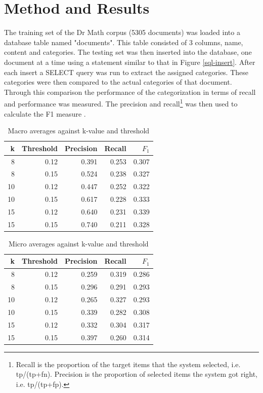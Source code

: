 \documentclass[twocolumn]{article}
\begin{document}
\section{Method and Results}

The training set of the Dr Math corpus (5305 documents) was loaded into a database 
table named "documents". This table consisted of 3 columns, name, content and 
categories. The testing set was then inserted into the database, one document at a time 
using a statement similar to that in Figure \ref{sql-insert}. After each insert a SELECT query was 
run to extract the assigned categories. These categories were then compared to the 
actual categories of that document. Through this comparison the performance of the 
categorization in terms of recall  and performance  was measured. The precision and 
recall\footnote{Recall is the proportion of the target items that the
system selected, i.e. tp/(tp+fn).  Precision is the proportion of
selected items the system got right, i.e. tp/(tp+fp).} was then used
to calculate the F1 measure \cite{calvo:01,sebastiani:02}.

\begin{table}
\begin{tabular}{|r|r|r|r|r|}
\hline
k  & Threshold & Precision & Recall & $F_1$ \\ \hline
8  & 0.12 & 0.391 & 0.253 & 0.307 \\ \hline
8  & 0.15 & 0.524 & 0.238 & 0.327 \\ \hline
10 & 0.12 & 0.447 & 0.252 & 0.322 \\ \hline
10 & 0.15 & 0.617 & 0.228 & 0.333 \\ \hline
15 & 0.12 & 0.640 & 0.231 & 0.339 \\ \hline
15 & 0.15 & 0.740 & 0.211 & 0.328 \\ \hline
\end{tabular}
\caption{Macro averages against k-value and threshold}
\label{macro-results}
\end{table}

\begin{table}
\begin{tabular}{|r|r|r|r|r|}
\hline
k  & Threshold & Precision & Recall & $F_1$ \\ \hline
8  & 0.12 & 0.259 & 0.319 & 0.286 \\ \hline
8  & 0.15 & 0.296 & 0.291 & 0.293 \\ \hline
10 & 0.12 & 0.265 & 0.327 & 0.293 \\ \hline
10 & 0.15 & 0.339 & 0.282 & 0.308 \\ \hline
15 & 0.12 & 0.332 & 0.304 & 0.317 \\ \hline
15 & 0.15 & 0.397 & 0.260 & 0.314 \\ \hline
\end{tabular}
\caption{Micro averages against k-value and threshold}
\label{micro-results}
\end{table}
\end{document}
